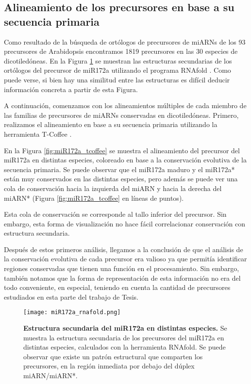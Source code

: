 \subsection{Alineamiento de los precursores en base a su secuencia primaria}

Como resultado de la búsqueda de ortólogos de precursores de miARNs de los 93 precursores de Arabidopsis encontramos 1819 precursores en las 30 especies de dicotiledóneas.
En la Figura \ref{fig:miR172a_rnafold} se muestran las estructuras secundarias de los ortólogos del precursor de miR172a utilizando el programa RNAfold \citep{pmid22115189}.
Como puede verse, si bien hay una similitud entre las estructuras es difícil deducir información concreta a partir de esta Figura.

A continuación, comenzamos con los alineamientos múltiples de cada miembro de las familias de precursores de miARNs conservadas en dicotiledóneas.
Primero, realizamos el alineamiento en base a su secuencia primaria utilizando la herramienta T-Coffee \citep{pmid10964570}.

En la Figura \ref{fig:miR172a_tcoffee} se muestra el alineamiento del precursor del miR172a en distintas especies, coloreado en base a la conservación evolutiva de la secuencia primaria.
Se puede observar que el miR172a maduro y el miR172a* están muy conservados en las distintas especies, pero además se puede ver una cola de conservación hacia la izquierda del miARN y hacia la derecha del miARN* (Figura \ref{fig:miR172a_tcoffee} en líneas de puntos).

Esta cola de conservación se corresponde al tallo inferior del precursor.
Sin embargo, esta forma de visualización no hace fácil correlacionar conservación con estructura secundaria.

Después de estos primeros análisis, llegamos a la conclusión de que el análisis de la conservación evolutiva de cada precursor era valioso ya que permitía identificar regiones conservadas que tienen una función en el procesamiento.
Sin embargo, también notamos que la forma de representación de esta información no era del todo conveniente, en especial, teniendo en cuenta la cantidad de precursores estudiados en esta parte del trabajo de Tesis.

\begin{landscape}
    \begin{figure}[htbp!] 
        \centering    
        \texttt{[image: miR172a\_rnafold.png]}
        \caption[Estructura secundaria del miR172a en distintas especies]{
        \textbf{Estructura secundaria del miR172a en distintas especies.}
        Se muestra la estructura secundaria de los precursores del miR172a en distintas especies, calculados con la herramienta RNAfold.
        Se puede observar que existe un patrón estructural que comparten los precursores, en la región inmediata por debajo del dúplex miARN/miARN*.
        }
        \label{fig:miR172a_rnafold}
    \end{figure}
\end{landscape}

